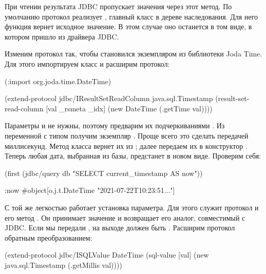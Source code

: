 При чтении результата JDBC пропускает значения через этот метод. По умолчанию протокол реализует , главный класс в дереве наследования. Для него функция  вернет исходное значение. В этом случае оно останется в том виде, в котором пришло из драйвера JDBC.

Изменим протокол так, чтобы  становился экземпляром  из библиотеки Joda Time. Для этого импортируем класс и расширим протокол:

\begin{english}
  \begin{clojure/lines}
(:import org.joda.time.DateTime)

(extend-protocol jdbc/IResultSetReadColumn
  java.sql.Timestamp
  (result-set-read-column [val _rsmeta _idx]
    (new DateTime (.getTime val))))
  \end{clojure/lines}
\end{english}

Параметры  и  не нужны, поэтому предварим их подчеркиваниями . Из переменной  с типом  получим экземпляр . Проще всего это сделать передачей миллисекунд. Метод  класса  вернет их из ; далее передаем их в конструктор . Теперь любая дата, выбранная из базы, предстанет в новом виде. Проверим себя:

\begin{english}
  \begin{clojure}
(first
  (jdbc/query db "SELECT current_timestamp AS now"))

{:now #object[o.j.t.DateTime "2021-07-22T10:23:51..."]}
  \end{clojure}
\end{english}

С той же легкостью работает установка параметра. Для этого служит протокол  и его метод . Он принимает значение и возвращает его аналог, совместимый с JDBC. Если мы передали , на выходе должен быть . Расширим протокол обратным преобразованием:

\begin{english}
  \begin{clojure}
(extend-protocol jdbc/ISQLValue
  DateTime
  (sql-value [val]
    (new java.sql.Timestamp (.getMillis val))))
  \end{clojure}
\end{english}

